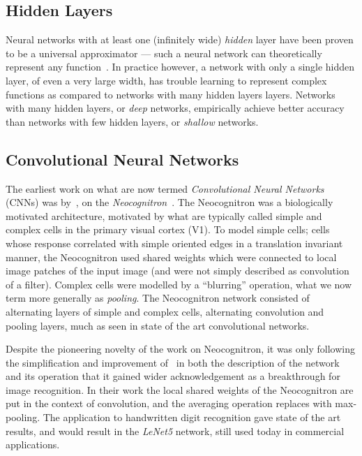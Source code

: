 \documentclass[thesis]{subfiles}
\begin{document}
\subsection{Hidden Layers}
Neural networks with at least one (infinitely wide) \emph{hidden} layer have been proven to be a universal approximator --- \ie such a neural network can theoretically represent any function~\citep{journals/mcss/Cybenko92,hornik89a}. In practice however, a network with only a single hidden layer, of even a very large width, has trouble learning to represent complex functions as compared to networks with many hidden layers layers. Networks with many hidden layers, or \emph{deep} networks, empirically achieve better accuracy than networks with few hidden layers, or \emph{shallow} networks.

\subsection{Convolutional Neural Networks}\label{cnns}
The earliest work on what are now termed \emph{Convolutional Neural Networks} (CNNs) was by~\citet{Fuk80}, on the \emph{Neocognitron}~\citep{fukushima2013artificial}. The Neocognitron was a biologically motivated architecture, motivated by what are typically called simple and complex cells in the primary visual cortex (V1). To model simple cells; cells whose response correlated with simple oriented edges in a translation invariant manner, the Neocognitron used shared weights which were connected to local image patches of the input image (and were not simply described as convolution of a filter). Complex cells were modelled by a ``blurring'' operation, what we now term more generally as \emph{pooling}. The Neocognitron network consisted of alternating layers of simple and complex cells, \ie{}alternating convolution and pooling layers, much as seen in state of the art convolutional networks.

Despite the pioneering novelty of the work on Neocognitron, it was only following the simplification and improvement of~\citet{Lecun1998} in both the description of the network and its operation that it gained wider acknowledgement as a breakthrough for image recognition. In their work the local shared weights of the Neocognitron are put in the context of convolution, and the averaging operation replaces with max-pooling. The application to handwritten digit recognition gave state of the art results, and would result in the \emph{LeNet5} network, still used today in commercial applications.
\end{document}
